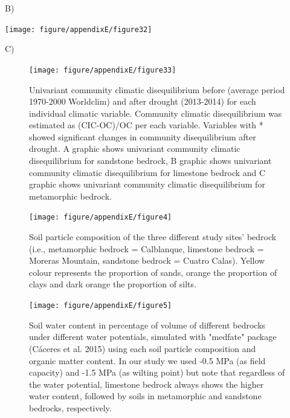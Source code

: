 \documentclass[11pt,twoside]{reedthesis}
\begin{document}
B)\newline
\begin{center}\texttt{[image: figure/appendixE/figure32]} \end{center}\newpage

C)\newline
\begin{figure}[hbt!]

{\centering \texttt{[image: figure/appendixE/figure33]} 

}

\caption[Univariant community climatic disequilibrium before  and after drought]{Univariant community climatic disequilibrium before (average period 1970-2000 Worldclim) and after drought (2013-2014) for each individual climatic variable. Community climatic disequilibrium was estimated as (CIC-OC)/OC per each variable. Variables with * showed significant changes in community disequilibrium after drought. A graphic shows univariant community climatic disequilibrium for sandstone bedrock, B graphic shows univariant community climatic disequilibrium for limestone bedrock and C graphic shows univariant community climatic disequilibrium for metamorphic bedrock.}\label{fig:unnamed-chunk-38}
\end{figure}\newpage
\begin{figure}[hbt!]

{\centering \texttt{[image: figure/appendixE/figure4]} 

}

\caption[Soil particle composition of the three different study sites]{Soil particle composition of the three different study sites’ bedrock (i.e., metamorphic bedrock = Calblanque, limestone bedrock = Moreras Mountain, sandstone bedrock = Cuatro Calas). Yellow colour represents the proportion of sands, orange the proportion of clays and dark orange the proportion of silts.}\label{fig:unnamed-chunk-39}
\end{figure}\newpage
\begin{figure}[hbt!]

{\centering \texttt{[image: figure/appendixE/figure5]} 

}

\caption[Soil water content in percentage of volume of different studied bedrocks]{Soil water content in percentage of volume of different bedrocks under different water potentials, simulated with "medfate" package (Cáceres et al. 2015) using each soil particle composition and organic matter content. In our study we used -0.5 MPa (as field capacity) and -1.5 MPa (as wilting point) but note that regardless of the water potential, limestone bedrock always shows the higher water content, followed by soils in metamorphic and sandstone bedrocks, respectively.}\label{fig:unnamed-chunk-40}
\end{figure}\newpage
\end{document}
